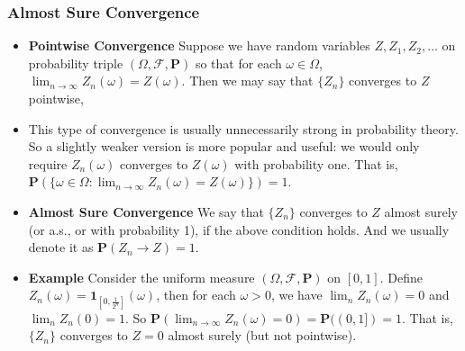 \documentclass[handout]{beamer}
\newcommand{\BP}{\mathbf{P}}
\newcommand{\BI}{\mathbf{1}}
\begin{document}
\frame
{
  \frametitle{Almost Sure Convergence}

   \begin{itemize}
       \item<1-> \textbf{Pointwise Convergence} Suppose we have random variables $Z, Z_1, Z_2, \ldots $ on probability triple $(\Omega,\mathcal{F}, \BP)$ so that for each $\omega \in \Omega$, $\lim_{n\rightarrow \infty} Z_n(\omega)= Z(\omega)$. Then we may say that $\{Z_n\}$ converges to $Z$ pointwise, 
       
 
       \item<2-> This type of convergence is usually unnecessarily strong in probability theory. So a slightly weaker version is more popular and useful: we would only require $Z_n(\omega)$ converges to $Z(\omega)$ with probability one. That is, $\BP(\{\omega \in \Omega: \lim_{n\rightarrow \infty} Z_n(\omega)= Z(\omega) \})=1$. 


     \item<3-> \textbf{Almost Sure Convergence} We say that $\{Z_n\}$ converges to $Z$ almost surely (or a.s., or with probability 1), if the above condition holds. And we usually denote it as $\BP(Z_n\rightarrow Z)=1$.
     
       \item<4-> \textbf{Example} Consider the uniform measure $(\Omega,\mathcal{F}, \BP)$ on $[0,1]$. Define $Z_n(\omega)=\BI_{[0,\frac{1}{2^n}]} (\omega)$, then for each $\omega>0$, we have $\lim_n Z_n(\omega)=0$ and $\lim_n Z_n (0)=1$. So  $\BP(\lim_{n\rightarrow \infty} Z_n(\omega)= 0)=\BP((0,1])=1$. That is, $\{Z_n\}$ converges to $Z=0$ almost surely (but not pointwise). 
                
\end{itemize}
}
\end{document}
